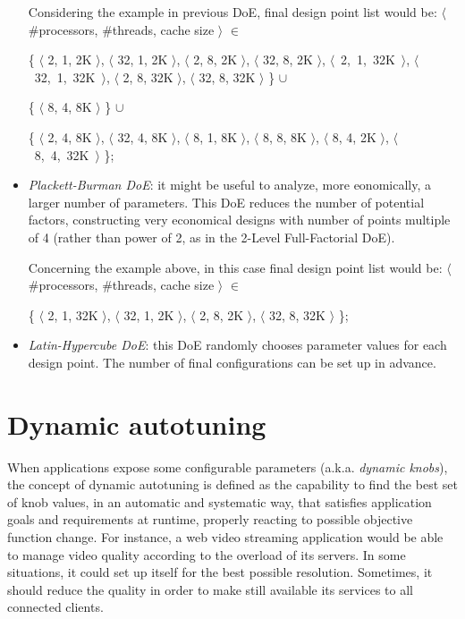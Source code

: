 \begin{itemize}
\begin{enumerate}
    \end{enumerate}
    
    Considering the example in previous DoE, final design point list would be: $\langle$ \#processors, \#threads, cache size $\rangle$ $\in$
    
    \{ $\langle$ 2, 1, 2K $\rangle$, $\langle$ 32, 1, 2K $\rangle$, $\langle$ 2, 8, 2K $\rangle$, $\langle$ 32, 8, 2K $\rangle$, \hbox{$\langle$ 2, 1, 32K $\rangle$}, \hbox{$\langle$ 32, 1, 32K $\rangle$}, $\langle$ 2, 8, 32K $\rangle$, $\langle$ 32, 8, 32K $\rangle$ \} $\cup$ 
    
    \{ $\langle$ 8, 4, 8K $\rangle$ \} $\cup$
    
    \{ $\langle$ 2, 4, 8K $\rangle$, $\langle$ 32, 4, 8K $\rangle$, $\langle$ 8, 1, 8K $\rangle$, $\langle$ 8, 8, 8K $\rangle$, $\langle$ 8, 4, 2K $\rangle$, \hbox{$\langle$ 8, 4, 32K $\rangle$} \};
    
    \item \textit{Plackett-Burman DoE}: it might be useful to analyze, more eonomically, a larger number of parameters. This DoE reduces the number of potential factors, constructing very economical designs with number of points multiple of 4 (rather than power of 2, as in the 2-Level Full-Factorial DoE).
    
    Concerning the example above, in this case final design point list would be: $\langle$ \#processors, \#threads, cache size $\rangle$ $\in$
    
    \{ $\langle$ 2, 1, 32K $\rangle$, $\langle$ 32, 1, 2K $\rangle$, $\langle$ 2, 8, 2K $\rangle$, $\langle$ 32, 8, 32K $\rangle$ \};
    
    \item \textit{Latin-Hypercube DoE}: this DoE randomly chooses parameter values for each design point. The number of final configurations can be set up in advance.

\end{itemize}





\section{Dynamic autotuning}

When applications expose some configurable parameters (a.k.a. \textit{dynamic knobs}), the concept of dynamic autotuning is defined as the capability to find the best set of knob values, in an automatic and systematic way, that satisfies application goals and requirements at runtime, properly reacting to possible objective function change. For instance, a web video streaming application would be able to manage video quality according to the overload of its servers. In some situations, it could set up itself for the best possible resolution. Sometimes, it should reduce the quality in order to make still available its services to all connected clients.

